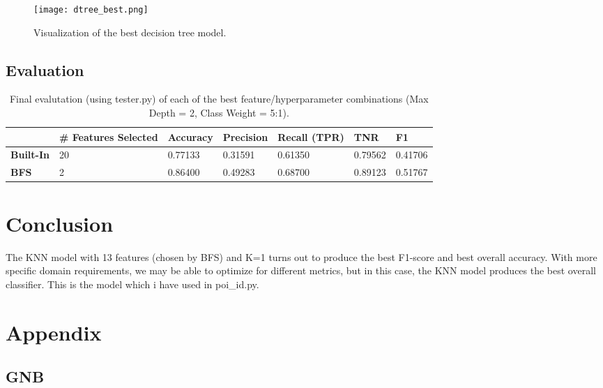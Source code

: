 \documentclass{article}
\begin{document}
\begin{figure}[H]
    \centering
    \texttt{[image: dtree\_best.png]}
    \caption{Visualization of the best decision tree model.}%
    \label{fig:best-dtree}%
\end{figure}

\subsection{Evaluation}

\begin{table}[H]
\centering
\caption{Final evalutation (using tester.py) of each of the best feature/hyperparameter combinations (Max Depth = 2, Class Weight = 5:1).}
\label{dtree-results}
\begin{tabular}{|l|l|l|l|l|l|l|}
\hline
                  & \textbf{\# Features Selected} & \textbf{Accuracy} & \textbf{Precision} & \textbf{Recall (TPR)} & \textbf{TNR} & \textbf{F1} \\ \hline
\textbf{Built-In} & 20                            & 0.77133           & 0.31591            & 0.61350               & 0.79562                          & 0.41706     \\ \hline
\textbf{BFS}      & 2                             & 0.86400           & 0.49283            & 0.68700               & 0.89123                          & 0.51767     \\ \hline
\end{tabular}
\end{table}

\section{Conclusion}

The KNN model with 13 features (chosen by BFS) and K=1 turns out to produce the best F1-score and best overall accuracy. With more specific domain requirements, we may be able to optimize for different metrics, but in this case, the KNN model produces the best overall classifier. This is the model which i have used in poi\_id.py.

\section{Appendix}

\subsection{GNB}
\end{document}
